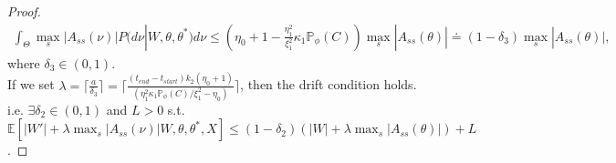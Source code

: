 \begin{proof}
\begin{align*}
\int_\Theta \max_s|A_{ss}(\nu)|P(d\nu| W, \theta, \theta^*) d\nu \leq (\eta_0 + 1 - \frac{\eta_1^2}{\xi_1^2} \kappa_1 \mathbb{P}_\phi(C)) \max_s|A_{ss}(\theta)| \doteq (1 - \delta_3) \max_s|A_{ss}(\theta)|,
\end{align*}
where $\delta_3 \in (0, 1)$.\\
If we set  $\lambda = \lceil\frac{a}{\delta_3} \rceil = \lceil \frac{(t_{end} - t_{start})k_2(\eta_0 + 1)}{(\eta_1^2 \kappa_1 \mathbb{P}_\phi(C)/\xi_1^2 - \eta_0)} \rceil$, then the drift condition holds.\\
i.e. $\exists \delta_2 \in (0, 1)$ and $L > 0$ s.t. $\mathbb{E}[|W'| + \lambda\max_s|A_{ss}(\nu)  | W, \theta, \theta^*, X] \leq (1 - \delta_2)(|W| + \lambda \max_s|A_{ss}(\theta)| ) + L$. 
\end{proof}
